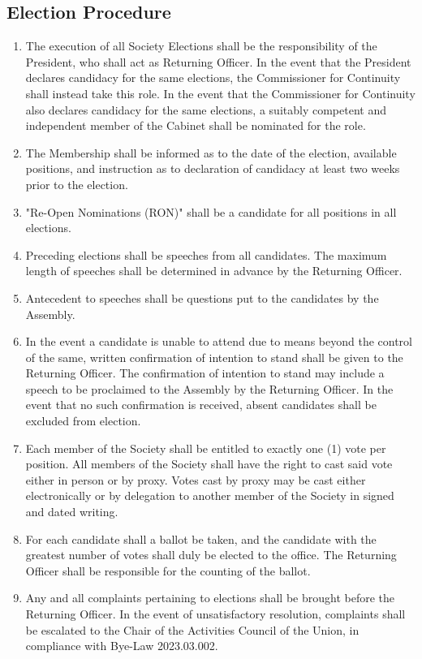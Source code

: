 \documentclass{scrartcl}
\begin{document}
        \subsection{Election Procedure}
            \label{bye-election--election-procedure}
            \begin{enumerate}
                \item The execution of all Society Elections shall be the responsibility of the President, who shall act as Returning Officer.
                    \subitem In the event that the President declares candidacy for the same elections, the Commissioner for Continuity shall instead take this role.
                    \subitem In the event that the Commissioner for Continuity also declares candidacy for the same elections, a suitably competent and independent member of the Cabinet shall be nominated for the role.
                \item The Membership shall be informed as to the date of the election, available positions, and instruction as to declaration of candidacy at least two weeks prior to the election.
                \item "Re-Open Nominations (RON)" shall be a candidate for all positions in all elections.
                \item Preceding elections shall be speeches from all candidates.
                    \subitem The maximum length of speeches shall be determined in advance by the Returning Officer.
                \item Antecedent to speeches shall be questions put to the candidates by the Assembly.
                \item In the event a candidate is unable to attend due to means beyond the control of the same, written confirmation of intention to stand shall be given to the Returning Officer.
                    \subitem The confirmation of intention to stand may include a speech to be proclaimed to the Assembly by the Returning Officer.
                    \subitem In the event that no such confirmation is received, absent candidates shall be excluded from election.
                \item Each member of the Society shall be entitled to exactly one (1) vote per position.
                    \subitem All members of the Society shall have the right to cast said vote either in person or by proxy.
                    \subitem Votes cast by proxy may be cast either electronically or by delegation to another member of the Society in signed and dated writing.
                \item For each candidate shall a ballot be taken, and the candidate with the greatest number of votes shall duly be elected to the office.
                    \subitem The Returning Officer shall be responsible for the counting of the ballot.
                \item Any and all complaints pertaining to elections shall be brought before the Returning Officer.
                    \subitem In the event of unsatisfactory resolution, complaints shall be escalated to the Chair of the Activities Council of the Union, in compliance with Bye-Law 2023.03.002.
            \end{enumerate}
\end{document}
